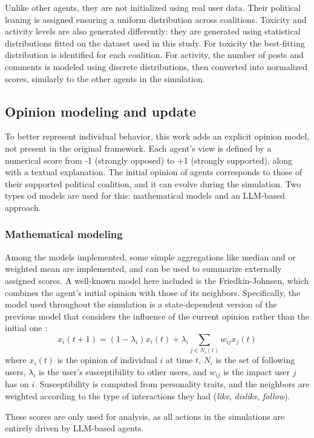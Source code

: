 Unlike other agents, they are not initialized using real user data.
Their political leaning is assigned ensuring a uniform distribution across coalitions.
Toxicity and activity levels are also generated differently: they are generated using statistical distributions fitted on the dataset used in this study.
For toxicity the best-fitting distribution is identified for each coalition.
For activity, the number of posts and comments is modeled using discrete distributions, then converted into normalized scores, similarly to the other agents in the simulation.


\subsection{Opinion modeling and update}
To better represent individual behavior, this work adds an explicit opinion model, not present in the original framework.
Each agent's view is defined by a numerical score from -1 (strongly opposed) to +1 (strongly supported), along with a textual explanation. 
The initial opinion of agents corresponds to those of their supported political coalition, and it can evolve during the simulation.
Two types od models are used for this: mathematical models and an LLM-based approach.

\subsubsection{Mathematical modeling}
Among the models implemented, some simple aggregations like median and or weighted mean are implemented, and can be used to summarize externally assigned scores.
A well-known model here included is the Friedkin-Johnsen, which combines the agent's initial opinion with those of its neighbors.
Specifically, the model used throughout the simulation is a state-dependent version of the previous model that considers the influence of the current opinion rather than the initial one \cite{Ye2018Opinion}:
\[
x_i(t + 1) = (1 - \lambda_i) x_i(t) + \lambda_i  \sum_{j \in N_i(t)} w_{ij} x_j (t)
\]
where $x_i(t)$ is the opinion of individual $i$ at time $t$, $N_i$ is the set of following users, $\lambda_i$ is the user's susceptibility to other users, and $w_{ij}$ is the impact user $j$ has on $i$. 
Susceptibility is computed from personality traits, and the neighbors are weighted according to the type of interactions they had (\textit{like}, \textit{dislike}, \textit{follow}). 

These scores are only used for analysis, as all actions in the simulations are entirely driven by LLM-based agents.


